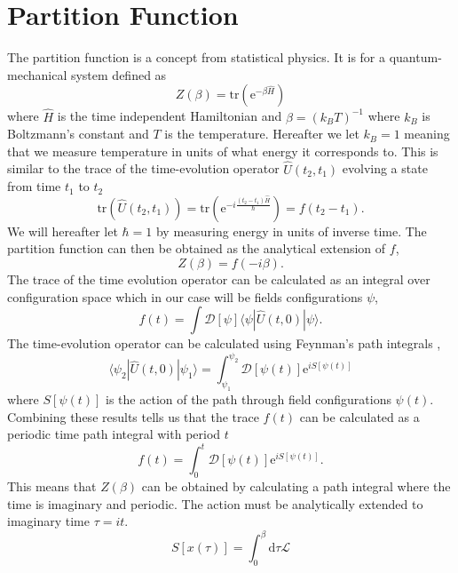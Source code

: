 \documentclass[12pt]{report}
\renewcommand{\d}{\ensuremath{\mathrm{d}}}
\newcommand{\e}{\ensuremath{\mathrm{e}}}
\renewcommand{\L}{\ensuremath{\mathcal{L}}}
\renewcommand{\i}{\ensuremath{i}}
\newcommand{\ket}[1]{|#1\rangle}
\newcommand{\bra}[1]{\langle#1|}
\newcommand{\bracket}[3]{\bra{#1}#2\ket{#3}}
\begin{document}
\section{Partition Function}
The partition function is a concept from statistical physics. It is for a quantum-mechanical system defined as
\begin{equation}
 Z(\beta)=\mathrm{tr}(\e^{-\beta\hat{H}})
\end{equation}
where $\hat{H}$ is the time independent Hamiltonian and $\beta=(k_BT)^{-1}$ where $k_B$ is Boltzmann's constant and $T$ is the temperature. Hereafter we let $k_B=1$ meaning that we measure temperature in units of what energy it corresponds to. This is similar to the trace of the time-evolution operator $\hat{U}(t_2,t_1)$ evolving a state from time $t_1$ to $t_2$
\begin{equation}
 \mathrm{tr}(\hat{U}(t_2,t_1))=\mathrm{tr}(\e^{-\i\frac{(t_2-t_1)\hat{H}}{\hbar}})=f(t_2-t_1).
\end{equation}
We will hereafter let $\hbar=1$ by measuring energy in units of inverse time. The partition function can then be obtained as the analytical extension of $f$,
\begin{equation}
 Z(\beta)=f(-\i\beta).
\end{equation}
The trace of the time evolution operator can be calculated as an integral over configuration space which in our case will be fields configurations $\psi$,
\begin{equation}
 f(t)=\int \mathcal{D}[\psi] \bracket{\psi}{\hat{U}(t,0)}{\psi}.
\end{equation}
The time-evolution operator can be calculated using Feynman's path integrals \cite{feynman1965quantum},
\begin{equation}
 \bracket{\psi_2}{\hat{U}(t,0)}{\psi_1}=\int_{\psi_1}^{\psi_2} \mathcal{D}[\psi(t)]\e^{\i S[\psi(t)]}
\end{equation}
where $S[\psi(t)]$ is the action of the path through field configurations $\psi(t)$. Combining these results tells us that the trace $f(t)$ can be calculated as a periodic time path integral with period $t$
\begin{equation}
 f(t)=\int_0^t \mathcal{D}[\psi(t)]\e^{\i S[\psi(t)]}.
\end{equation}
This means that $Z(\beta)$ can be obtained by calculating a path integral where the time is imaginary and periodic. The action must be analytically extended to imaginary time $\tau=\i t$.
\begin{equation}
 S[x(\tau)]=\int_0^\beta\d \tau \L
\end{equation}
\end{document}
